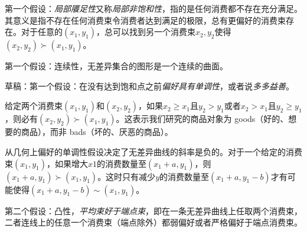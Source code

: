 第一个假设：\emph{局部餍足性}又称\emph{局部非饱和性}，指的是任何消费都不存在充分满足。其意义是指不存在任何消费束令消费者达到满足的极限，总有更偏好的消费束存在。对于任意的$(x_1,y_1)$，总可以找到另一个消费束$x_2,y_2$使得$(x_2, y_2) \succ (x_1, y_1)$。

第一个假设：连续性，无差异集合的图形是一个连续的曲面。

草稿：第一个假设：在没有达到饱和点之前\emph{偏好具有单调性}，或者说\emph{多多益善}。

给定两个消费束$(x_1, y_1)$和$(x_2, y_2)$，如果$x_2 \geq x_1$且$y_2 > y_1$或者$x_2 > x_1$且$y_2 \geq y_1$，则必有$(x_2, y_2) \succ (x_1, y_1)$。这表示我们研究的商品对象为 goods（好的、想要的商品），而非 bads（坏的、厌恶的商品）。

从几何上偏好的单调性假设决定了无差异曲线的斜率是负的。对于一个给定的消费束$(x_1, y_1)$，如果增大$x1$的消费数量至$(x_1 + a, y_1)$，则$(x_1 + a, y_1) \succ (x_1, y_1)$。这时只有减少$y$的消费数量至$(x_1 + a, y_1 -b)$才有可能使得$(x_1 + a, y_1 -b) \sim (x_1, y_1)$。

第二个假设：凸性，\emph{平均束好于端点束}，即在一条无差异曲线上任取两个消费束，二者连线上的任意一个消费束（端点除外）都弱偏好或者严格偏好于端点消费束。

